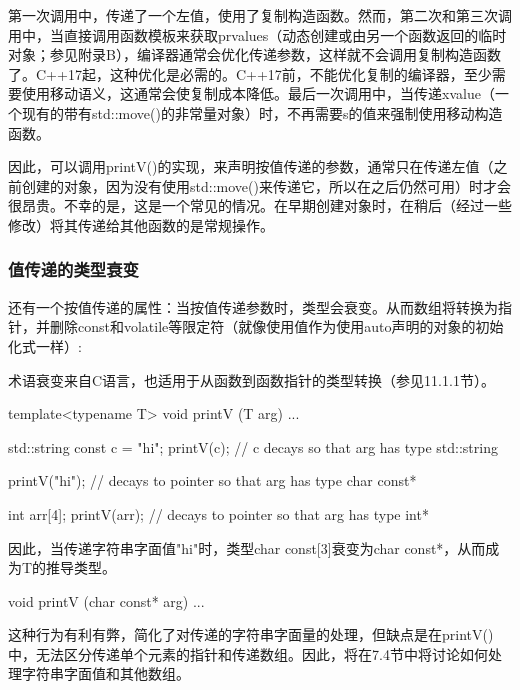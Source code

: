 第一次调用中，传递了一个左值，使用了复制构造函数。然而，第二次和第三次调用中，当直接调用函数模板来获取prvalues（动态创建或由另一个函数返回的临时对象；参见附录B），编译器通常会优化传递参数，这样就不会调用复制构造函数了。C++17起，这种优化是必需的。C++17前，不能优化复制的编译器，至少需要使用移动语义，这通常会使复制成本降低。最后一次调用中，当传递xvalue（一个现有的带有std::move()的非常量对象）时，不再需要s的值来强制使用移动构造函数。

因此，可以调用printV()的实现，来声明按值传递的参数，通常只在传递左值（之前创建的对象，因为没有使用std::move()来传递它，所以在之后仍然可用）时才会很昂贵。不幸的是，这是一个常见的情况。在早期创建对象时，在稍后（经过一些修改）将其传递给其他函数的是常规操作。

\subsubsection{值传递的类型衰变}

还有一个按值传递的属性：当按值传递参数时，类型会衰变。从而数组将转换为指针，并删除const和volatile等限定符（就像使用值作为使用auto声明的对象的初始化式一样）:

\begin{notice}
术语衰变来自C语言，也适用于从函数到函数指针的类型转换（参见11.1.1节）。
\end{notice}

\begin{cpp}
template<typename T>
void printV (T arg) {
	...
}

std::string const c = "hi";
printV(c); // c decays so that arg has type std::string

printV("hi"); // decays to pointer so that arg has type char const*

int arr[4];
printV(arr); // decays to pointer so that arg has type int*
\end{cpp}

因此，当传递字符串字面值"hi"时，类型char const[3]衰变为char const*，从而成为T的推导类型。

\begin{cpp}
void printV (char const* arg)
{
	...
}
\end{cpp}

这种行为有利有弊，简化了对传递的字符串字面量的处理，但缺点是在printV()中，无法区分传递单个元素的指针和传递数组。因此，将在7.4节中将讨论如何处理字符串字面值和其他数组。




